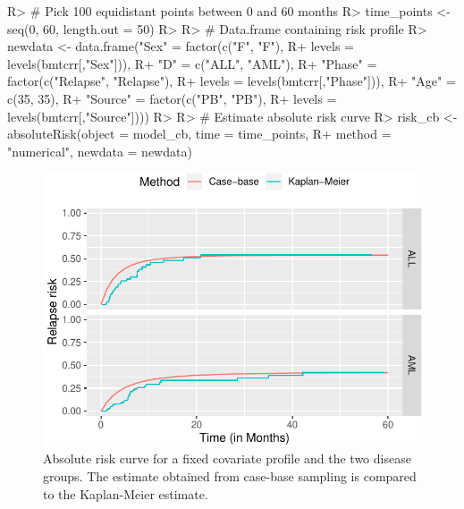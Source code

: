 \documentclass[
]{jss}
\begin{document}
\begin{CodeChunk}

\begin{CodeInput}
R> # Pick 100 equidistant points between 0 and 60 months
R> time_points <- seq(0, 60, length.out = 50)
R> 
R> # Data.frame containing risk profile
R> newdata <- data.frame("Sex" = factor(c("F", "F"), 
R+                                      levels = levels(bmtcrr[,"Sex"])),
R+                       "D" = c("ALL", "AML"),
R+                       "Phase" = factor(c("Relapse", "Relapse"), 
R+                                        levels = levels(bmtcrr[,"Phase"])),
R+                       "Age" = c(35, 35),
R+                       "Source" = factor(c("PB", "PB"), 
R+                                         levels = levels(bmtcrr[,"Source"])))
R> 
R> # Estimate absolute risk curve
R> risk_cb <- absoluteRisk(object = model_cb, time = time_points,
R+                         method = "numerical", newdata = newdata)
\end{CodeInput}
\end{CodeChunk}

\begin{CodeChunk}
\begin{figure}

{\centering \includegraphics{../figures/unnamed-chunk-3-1} 

}

\caption{\label{fig:compAbsrisk}Absolute risk curve for a fixed covariate profile and the two disease groups. The estimate obtained from case-base sampling is compared to the Kaplan-Meier estimate.}\label{fig:unnamed-chunk-3}
\end{figure}
\end{CodeChunk}
\end{document}
